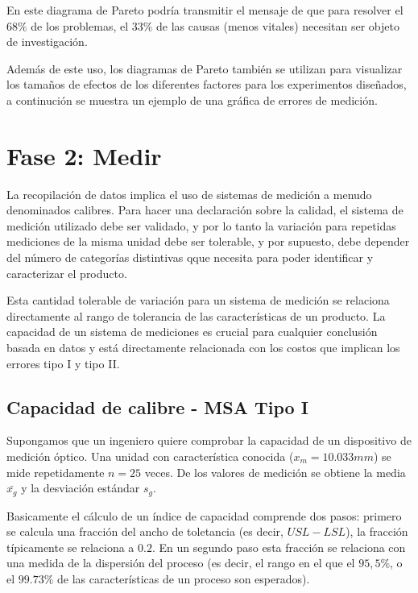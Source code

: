 \documentclass[
]{book}
\begin{document}
En este diagrama de Pareto podría transmitir el mensaje de que para resolver el \(68\%\) de los problemas, el \(33 \%\) de las causas (menos vitales) necesitan ser objeto de investigación.

Además de este uso, los diagramas de Pareto también se utilizan para visualizar los tamaños de efectos de los diferentes factores para los experimentos diseñados, a continución se muestra un ejemplo de una gráfica de errores de medición.

\hypertarget{fase-2-medir}{%
\section{Fase 2: Medir}\label{fase-2-medir}}

La recopilación de datos implica el uso de sistemas de medición a menudo denominados calibres. Para hacer una declaración sobre la calidad, el sistema de medición utilizado debe ser validado, y por lo tanto la variación para repetidas mediciones de la misma unidad debe ser tolerable, y por supuesto, debe depender del número de categorías distintivas qque necesita para poder identificar y caracterizar el producto.

Esta cantidad tolerable de variación para un sistema de medición se relaciona directamente al rango de tolerancia de las características de un producto. La capacidad de un sistema de mediciones es crucial para cualquier conclusión basada en datos y está directamente relacionada con los costos que implican los errores tipo I y tipo II.

\hypertarget{capacidad-de-calibre---msa-tipo-i}{%
\subsection{Capacidad de calibre - MSA Tipo I}\label{capacidad-de-calibre---msa-tipo-i}}

Supongamos que un ingeniero quiere comprobar la capacidad de un dispositivo de medición óptico. Una unidad con característica conocida (\(x_m = 10.033mm\)) se mide repetidamente \(n=25\) veces. De los valores de medición se obtiene la media \(\bar{x_g}\) y la desviación estándar \(s_g\).

Basicamente el cálculo de un índice de capacidad comprende dos pasos: primero se calcula una fracción del ancho de toletancia (es decir, \(USL - LSL\)), la fracción típicamente se relaciona a \(0.2\). En un segundo paso esta fracción se relaciona con una medida de la dispersión del proceso (es decir, el rango en el que el \(95,5\%\), o el \(99.73\%\) de las características de un proceso son esperados).
\end{document}
